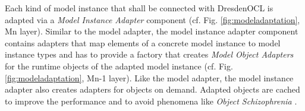	Each kind of model instance that shall be connected with DresdenOCL is
	adapted via a \emph{Model Instance Adapter} component (cf. Fig.
	\ref{fig:modeladaptation}, Mn layer). Similar to the model adapter, 
	the model instance adapter component contains adapters that map elements of a
	concrete model instance to model instance types and has to
	provide a factory that creates \emph{Model Object Adapters} for the runtime 
	objects of the adapted model instance (cf. Fig. \ref{fig:modeladaptation}, Mn-1 layer). 
	Like the model adapter, the model instance adapter also 
	creates adapters for objects on demand. Adapted objects are cached to
	improve the performance and to avoid phenomena like \emph{Object
	Schizophrenia} \cite{assmann:isc}.
	


